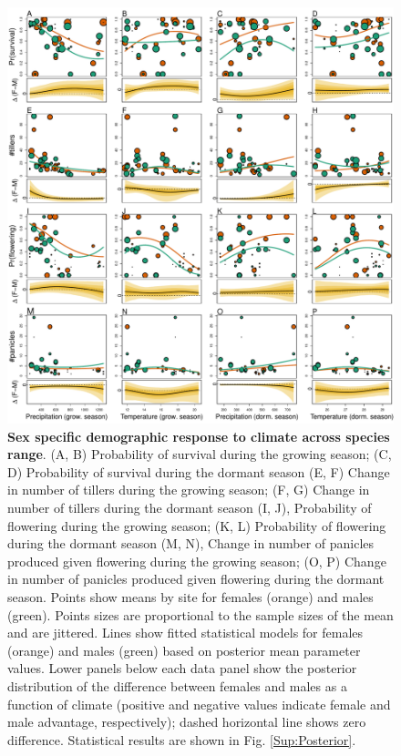 \documentclass[12pt]{article}\usepackage[]{graphicx}\usepackage[dvipsnames]{xcolor}
\begin{document}
\begin{figure}[H]
  \begin{center}
    \includegraphics[width=0.95\linewidth]{Figures/vital_rates.pdf}
  \caption{\textbf{Sex specific demographic response to climate across species range}.
  (A, B) Probability of survival during the growing season; (C, D) Probability of survival during the dormant season
  (E, F) Change in number of tillers during the growing season; (F, G) Change in number of tillers during the dormant season
  (I, J), Probability of flowering during the growing season; (K, L) Probability of flowering during the dormant season
  (M, N), Change in number of panicles produced given flowering during the growing season; (O, P) Change in number of panicles produced given flowering during the dormant season.
  Points show means by site for females (orange) and males (green). 
  Points sizes are proportional to the sample sizes of the mean and are jittered.
  Lines show fitted statistical models for females (orange) and males (green) based on posterior mean parameter values.
  Lower panels below each data panel show the posterior distribution of the difference between females and males as a function of climate (positive and negative values indicate female and male advantage, respectively); dashed horizontal line shows zero difference.
  Statistical results are shown in Fig. \ref{Sup:Posterior}.}
  \label{fig:vital_rates}
  \end{center}
\end{figure}
\end{document}
